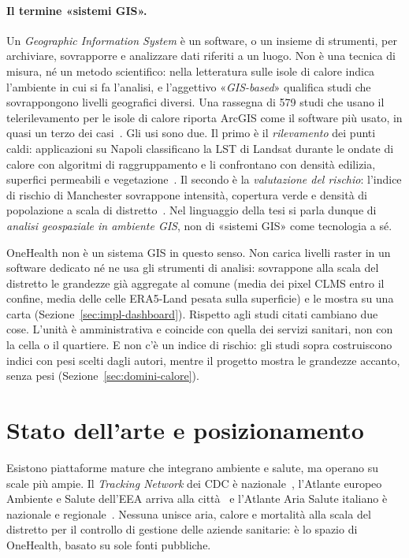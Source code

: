 \paragraph{Il termine «sistemi GIS».} Un \emph{Geographic Information System} è un software, o un insieme di strumenti, per archiviare, sovrapporre e analizzare dati riferiti a un luogo. Non è una tecnica di misura, né un metodo scientifico: nella letteratura sulle isole di calore indica l'ambiente in cui si fa l'analisi, e l'aggettivo «\emph{GIS-based}» qualifica studi che sovrappongono livelli geografici diversi. Una rassegna di 579 studi che usano il telerilevamento per le isole di calore riporta ArcGIS come il software più usato, in quasi un terzo dei casi~\cite{almeida2021}. Gli usi sono due. Il primo è il \emph{rilevamento} dei punti caldi: applicazioni su Napoli classificano la LST di Landsat durante le ondate di calore con algoritmi di raggruppamento e li confrontano con densità edilizia, superfici permeabili e vegetazione~\cite{cafaro2024}. Il secondo è la \emph{valutazione del rischio}: l'indice di rischio di Manchester sovrappone intensità, copertura verde e densità di popolazione a scala di distretto~\cite{elmarakby2024}. Nel linguaggio della tesi si parla dunque di \emph{analisi geospaziale in ambiente GIS}, non di «sistemi GIS» come tecnologia a sé.

OneHealth non è un sistema GIS in questo senso. Non carica livelli raster in un software dedicato né ne usa gli strumenti di analisi: sovrappone alla scala del distretto le grandezze già aggregate al comune (media dei pixel CLMS entro il confine, media delle celle ERA5-Land pesata sulla superficie) e le mostra su una carta (Sezione~\ref{sec:impl-dashboard}). Rispetto agli studi citati cambiano due cose. L'unità è amministrativa e coincide con quella dei servizi sanitari, non con la cella o il quartiere. E non c'è un indice di rischio: gli studi sopra costruiscono indici con pesi scelti dagli autori, mentre il progetto mostra le grandezze accanto, senza pesi (Sezione~\ref{sec:domini-calore}).

\section{Stato dell'arte e posizionamento}
\label{sec:domini-stato-arte}

Esistono piattaforme mature che integrano ambiente e salute, ma operano su scale più ampie. Il \emph{Tracking Network} dei CDC è nazionale~\cite{cdc_tracking}, l'Atlante europeo Ambiente e Salute dell'EEA arriva alla città~\cite{eea_atlas} e l'Atlante Aria Salute italiano è nazionale e regionale~\cite{atlante_aria_salute}. Nessuna unisce aria, calore e mortalità alla scala del distretto per il controllo di gestione delle aziende sanitarie: è lo spazio di OneHealth, basato su sole fonti pubbliche.
